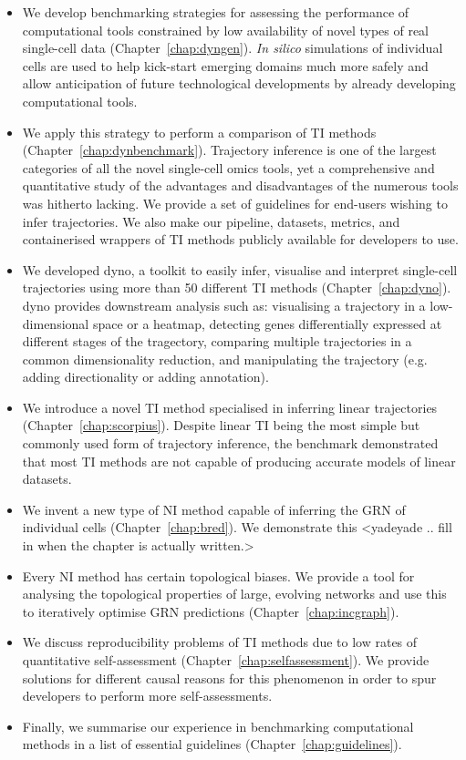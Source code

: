 \begin{itemize}
	\item We develop benchmarking strategies for assessing the performance of computational tools constrained by low availability of novel types of real single-cell data (Chapter~\ref{chap:dyngen}). \textit{In silico} simulations of individual cells are used to help kick-start emerging domains much more safely and allow anticipation of future technological developments by already developing computational tools.
	\item We apply this strategy to perform a comparison of TI methods (Chapter~\ref{chap:dynbenchmark}). Trajectory inference is one of the largest categories of all the novel single-cell omics tools, yet a comprehensive and quantitative study of the advantages and disadvantages of the numerous tools was hitherto lacking. We provide a set of guidelines for end-users wishing to infer trajectories. We also make our pipeline, datasets, metrics, and containerised wrappers of TI methods publicly available for developers to use.
	\item We developed dyno, a toolkit to easily infer, visualise and interpret single-cell trajectories using more than 50 different TI methods (Chapter~\ref{chap:dyno}). dyno provides downstream analysis such as: visualising a trajectory in a low-dimensional space or a heatmap, detecting genes differentially expressed at different stages of the tragectory, comparing multiple trajectories in a common dimensionality reduction, and manipulating the trajectory (e.g. adding directionality or adding annotation).
	\item We introduce a novel TI method specialised in inferring linear trajectories (Chapter~\ref{chap:scorpius}). Despite linear TI being the most simple but commonly used form of trajectory inference, the benchmark demonstrated that most TI methods are not capable of producing accurate models of linear datasets.
	\item We invent a new type of NI method capable of inferring the GRN of individual cells (Chapter~\ref{chap:bred}). We demonstrate this <yadeyade .. fill in when the chapter is actually written.>
	\item Every NI method has certain topological biases. We provide a tool for analysing the topological properties of large, evolving networks and use this to iteratively optimise GRN predictions (Chapter~\ref{chap:incgraph}).
	\item We discuss reproducibility problems of TI methods due to low rates of quantitative self-assessment (Chapter~\ref{chap:selfassessment}). We provide solutions for different causal reasons for this phenomenon in order to spur developers to perform more self-assessments.
	\item Finally, we summarise our experience in benchmarking computational methods in a list of essential guidelines (Chapter~\ref{chap:guidelines}).
\end{itemize}


